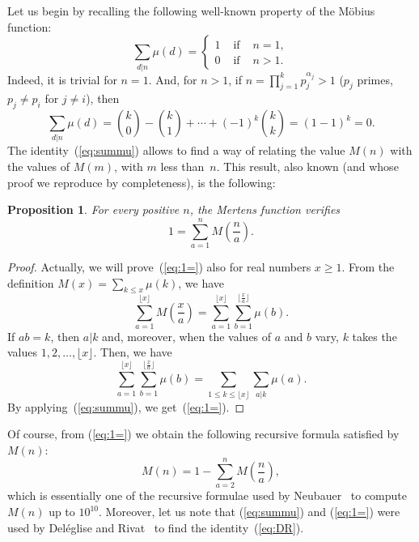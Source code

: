 \documentclass[10pt]{amsart}
\newtheorem{propo}[theor]{Proposition}
\begin{document}
Let us begin by recalling the following well-known property of the
M\"obius function:
\begin{equation}
\label{eq:summu}
\sum_{d|n}\mu(d) =
\left\{
\begin{array}{lll}
1& \mbox{ if } & n=1,\\
0& \mbox{ if } & n>1.
\end{array}
\right.
\end{equation}
Indeed, it is trivial for $n=1$. And, for $n>1$, if
$n = \prod_{j=1}^kp_j^{\alpha_j}>1$ ($p_j$ primes, $p_j \ne p_i$ for $j \ne i$),
then
$$
\sum_{d|n}\mu(d) = \binom{k}{0} - \binom{k}{1}
+ \cdots + (-1)^k\binom{k}{k} = (1-1)^k = 0.
$$
The identity~(\ref{eq:summu}) allows to find a way of relating the value
$M(n)$ with the values of $M(m)$, with $m$ less than~$n$. This result, also
known (and whose proof we reproduce by completeness), is the following:

\begin{propo}
\label{th:1=}
For every positive $n$, the Mertens function verifies
\begin{equation}
\label{eq:1=}
1 = \sum_{a=1}^n M\left(\frac na\right).
\end{equation}
\end{propo}

\begin{proof}
Actually, we will prove~(\ref{eq:1=}) also for real numbers $x \geq 1$.
{}From the definition $M(x) = \sum_{k \leq x}\mu(k)$, we have
$$
\sum_{a=1}^{\lfloor x\rfloor} M\left(\frac xa\right)
= \sum_{a=1}^{\lfloor x\rfloor}
\sum_{b=1}^{\lfloor \frac xa \rfloor} \mu(b).
$$
If $ab=k$, then $a|k$ and, moreover, when the values of $a$ and $b$ vary,
$k$ takes the values $1, 2, \ldots, \lfloor x\rfloor$.
Then, we have
$$
\sum_{a=1}^{\lfloor x\rfloor}
\sum_{b=1}^{\lfloor \frac xa \rfloor} \mu(b)
= \sum_{1\leq k\leq \lfloor x\rfloor}\sum_{a|k}\mu(a).
$$
By applying~(\ref{eq:summu}), we get~(\ref{eq:1=}).
\end{proof}

Of course, from (\ref{eq:1=}) we obtain the following recursive formula
satisfied by~$M(n)$:
\begin{equation}
\label{eq:1-}
M(n) = 1-\sum_{a=2}^n M\left(\frac na\right),
\end{equation}
which is essentially one of the recursive formulae used by Neubauer~\cite{Neu} 
to compute $M(n)$ up to $10^{10}$.
Moreover, let us note that (\ref{eq:summu}) and (\ref{eq:1=}) were used by Del\'eglise
and Rivat~\cite{DeRi} to find the identity~(\ref{eq:DR}).
\end{document}
